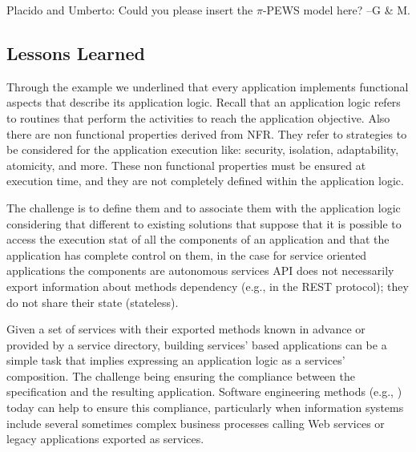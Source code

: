 {\color{magenta} Placido and Umberto: Could you please insert the $\pi$-PEWS model here? --G \& M.}


\subsection{Lessons Learned}

Through the example we underlined that every application implements functional aspects that describe its application logic.
Recall that an application logic refers to routines that perform the activities to reach the application objective.
Also there are non functional properties derived from NFR. They refer to strategies to be considered for the application execution like: security, isolation, adaptability, atomicity, and more.
These non functional properties must be ensured at execution time, and they are not completely defined within the application logic.

The challenge is to define them and to associate them with the application logic considering that different to existing solutions that suppose that it is possible to access the execution stat of all the components  of an application and that the application has complete control on them, in the case for service oriented applications  the components are autonomous services
API does not necessarily export information about methods dependency (e.g., in the REST protocol);
they do not share their state (stateless).

Given a set of services with their exported methods known in advance or provided by a  service directory, building services' based applications can be  a simple task that implies expressing an application logic as a services' composition. The challenge being  ensuring the compliance between the specification and the resulting application. Software engineering methods (e.g., \cite{1,2,decastro1,PapazoglouH06}) today can help to ensure this compliance, particularly when information systems include several sometimes complex business processes calling Web services or legacy applications exported as services.
